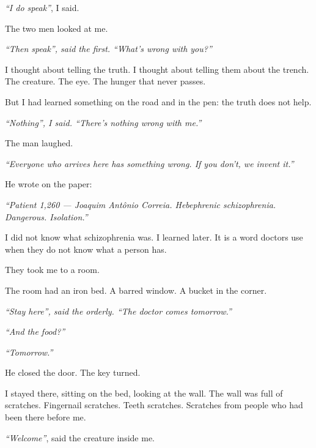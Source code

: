 \noindent \textit{\textquotedblleft{}I do speak\textquotedblright{}}, I said.

\noindent The two men looked at me.

\noindent \textit{\textquotedblleft{}Then speak\textquotedblright{}\textit{, said the first. }\textquotedblleft{}What's wrong with you?\textquotedblright{}}

\noindent I thought about telling the truth. I thought about telling them about the trench. The creature. The eye. The hunger that never passes.

\noindent But I had learned something on the road and in the pen: the truth does not help.

\noindent \textit{\textquotedblleft{}Nothing\textquotedblright{}\textit{, I said. }\textquotedblleft{}There's nothing wrong with me.\textquotedblright{}}

\noindent The man laughed.

\noindent \textit{\textquotedblleft{}Everyone who arrives here has something wrong. If you don't, we invent it.\textquotedblright{}}

\noindent He wrote on the paper:

\noindent \textit{\textquotedblleft{}Patient 1,260 --- Joaquim Antônio Correia. Hebephrenic schizophrenia. Dangerous. Isolation.\textquotedblright{}}

\noindent I did not know what schizophrenia was. I learned later. It is a word doctors use when they do not know what a person has.

\noindent They took me to a room.

\noindent The room had an iron bed. A barred window. A bucket in the corner.

\noindent \textit{\textquotedblleft{}Stay here\textquotedblright{}\textit{, said the orderly. }\textquotedblleft{}The doctor comes tomorrow.\textquotedblright{}}

\noindent \textit{\textquotedblleft{}And the food?\textquotedblright{}}

\noindent \textit{\textquotedblleft{}Tomorrow.\textquotedblright{}}

\noindent He closed the door. The key turned.

\noindent I stayed there, sitting on the bed, looking at the wall. The wall was full of scratches. Fingernail scratches. Teeth scratches. Scratches from people who had been there before me.

\noindent \textit{\textquotedblleft{}Welcome\textquotedblright{}}, said the creature inside me.

